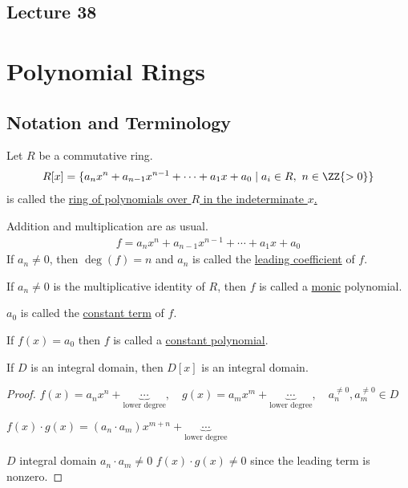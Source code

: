\documentclass[a4paper]{article}
\begin{document}
\subsection*{Lecture 38} %
\section{Polynomial Rings}
\subsection{Notation and Terminology}
\begin{definition}
  Let \( R \) be a commutative ring.
  \begin{align*}
    R[x] = \{a_nx^n + a_{n-1}x^{n-1} + \cdots + a_1x+a_0 \mid a_i\in R,\ n\in\ZZ{>0}\}
  \end{align*}
  is called the \uline{ring of polynomials over \( R \) in the indeterminate \( x \).}
\end{definition}

Addition and multiplication are as usual.
\begin{align*}
  f=a_nx^n + a_{n-1}x^{n-1} + \cdots + a_1x+a_0
\end{align*}
If \( a_n\neq 0 \), then \uline{\( \deg(f) = n \)} and \( a_n \) is called the \uline{leading coefficient} of \( f \).

If \( a_n\neq 0 \) is the multiplicative identity of \( R \), then \( f \) is called a \uline{monic} polynomial.

\( a_0 \) is called the \uline{constant term} of \( f \).

If \( f(x) = a_0 \) then \( f \) is called a \uline{constant polynomial}.

\begin{theorem}
  If \( D \) is an integral domain, then \( D[x] \) is an integral domain.
\end{theorem}

\begin{proof}
  \( f(x) = a_nx^n+\underbrace{\cdots}_{\text{lower degree}},\quad g(x) = a_mx^m + \underbrace{\cdots}_{\text{lower degree}},\quad a_n^{\neq 0}, a_m^{\neq 0} \in D \)

  \( f(x)\cdot g(x) =  (a_n \cdot a_m)x^{m+n} + \underbrace{\cdots}_{\text{lower degree}} \)

  \( D \) integral domain \imp \( a_n\cdot a_m \neq 0 \) \imp \( f(x)\cdot g(x)\neq 0 \) since the leading term is nonzero.
\end{proof}
\end{document}
